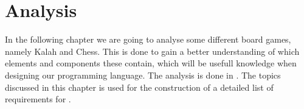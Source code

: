 \chapter{Analysis}
In the following chapter we are going to analyse some different board games, namely Kalah and Chess. This is done to gain a better understanding of which elements and components these contain, which will be usefull knowledge when designing our programming language. The analysis is done in . The topics discussed in this chapter is used for the construction of a detailed list of requirements for \productname{}.









%




